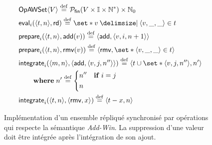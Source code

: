 
\begin{figure}[bth]
\centering
\begin{align}
&\trm{OpAWSet}\tuple*{V} \defeq \powerfset{V \times \mathbb{I} \times \mathbb{N}^*} \times \mathbb{N}_0 \label{eq:op-awset-state}\\
&\trm{eval}_i(\tuple*{t, n}, \trm{rd}) \defeq \set*{v \given \tuple*{v, \_, \_} \in t} \label{eq:op-awset-eval}\\
&\trm{prepare}_i(\tuple*{t, n}, \trm{add}(v)) \defeq \tuple*{\trm{add}, \tuple*{v, i, n+1}} \label{eq:op-awset-prep-add}\\
&\trm{prepare}_i(\tuple*{t, n}, \trm{rmv}(v)) \defeq \tuple*{\trm{rmv}, \set*{\tuple*{v, \_, \_} \in t}} \label{eq:op-awset-prep-rmv}\\
&\begin{aligned}
\MoveEqLeft\trm{integrate}_i(\tuple*{m, n}, \tuple*{\trm{add}, \tuple*{v, j, n''}}) \defeq \tuple{t \cup \set*{\tuple*{v, j, n''}}, n'}\\
    &\where n' \defeq \begin{dcases}
        n'' & \when i = j\\
        n
    \end{dcases}
\end{aligned}\label{eq:op-awset-integr-add}\\
&\trm{integrate}_i(\tuple*{t, n}, \tuple*{\trm{rmv}, x}) \defeq \tuple*{t \sminus x, n} \label{eq:op-awset-integr-rmv}
\end{align}
\caption[Implémentation d'un ensemble répliqué synchronisé par opérations]{Implémentation d'un ensemble répliqué synchronisé par opérations qui respecte la sémantique \emph{Add-Win}.
La suppression d'une valeur doit être intégrée après l'intégration de son ajout.}\label{fig:op-add-win-set}
\end{figure}

\clearpage %

